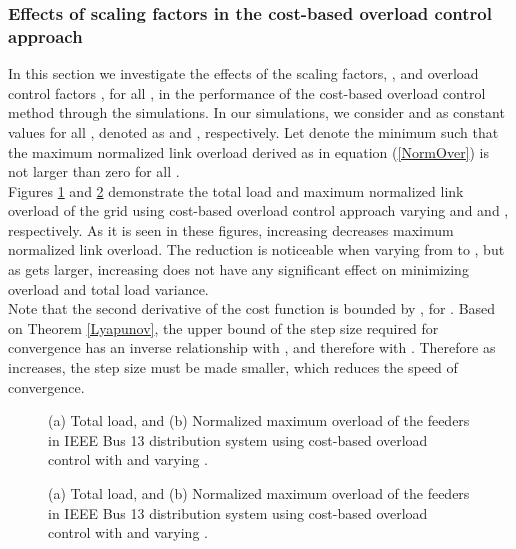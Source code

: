\documentclass[12pt,draftcls,onecolumn]{IEEEtran}
\begin{document}
\subsubsection{Effects of scaling factors in the cost-based overload control approach}
In this section we investigate the effects of the scaling factors, , and overload control factors , for all , in the performance of the cost-based overload control method through the simulations. In our simulations, we consider  and  as constant values for all , denoted as  and , respectively. Let  denote the minimum  such that the maximum normalized link overload derived as in equation (\ref{NormOver}) is not larger than zero for all .\\
\indent Figures \ref{Betac90} and \ref{Betac95} demonstrate the total load and maximum normalized link overload of the grid using cost-based overload control approach varying  and  and , respectively. As it is seen in these figures, increasing  decreases maximum normalized link overload. The reduction is noticeable when varying  from  to , but as  gets larger, increasing  does not have any significant effect on minimizing overload and total load variance.\\
\indent Note that the second derivative of the cost function  is bounded by , for . Based on Theorem \ref{Lyapunov}, the upper bound of the step size  required for convergence has an inverse relationship with , and therefore with .  Therefore as  increases, the step size must be made smaller, which reduces the speed of convergence.
\begin{figure}[H]
\centering
{}
\caption{(a) Total load, and (b) Normalized maximum overload of the feeders in IEEE Bus 13 distribution system using cost-based overload control with  and varying .}
\label{Betac90}
\end{figure}
\begin{figure}[H]
\centering
{}
\caption{(a) Total load, and (b) Normalized maximum overload of the feeders in IEEE Bus 13 distribution system using cost-based overload control with  and varying .}
\label{Betac95}
\end{figure}
\end{document}
